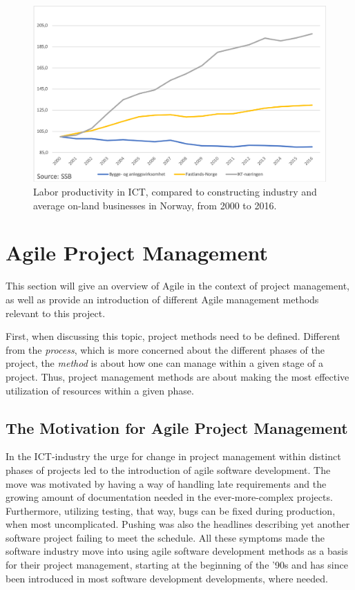 \begin{figure}
    \centering
    \includegraphics[width=\textwidth]{fig/ba_on-land_ICT.png}
    \caption{Labor productivity in ICT, compared to constructing industry and average on-land businesses in Norway, from 2000 to 2016.}
    \label{fig:LP_ICT_VS}
\end{figure}

\section{Agile Project Management}
This section will give an overview of Agile in the context of project management, as well as provide an introduction of different Agile management methods relevant to this project. 

First, when discussing this topic, project methods need to be defined. Different from the \textit{process}, which is more concerned about the different phases of the project, the \textit{method} is about how one can manage within a given stage of a project. Thus, project management methods are about making the most effective utilization of resources within a given phase. 

\subsection{The Motivation for Agile Project Management}
In the ICT-industry the urge for change in project management within distinct phases of projects led to the introduction of agile software development. The move was motivated by having a way of handling late requirements and the growing amount of documentation needed in the ever-more-complex projects. Furthermore, utilizing testing, that way, bugs can be fixed during production, when most uncomplicated. Pushing was also the headlines describing yet another software project failing to meet the schedule. All these symptoms made the software industry move into using agile software development methods as a basis for their project management, starting at the beginning of the '90s and has since been introduced in most software development developments, where needed.  


